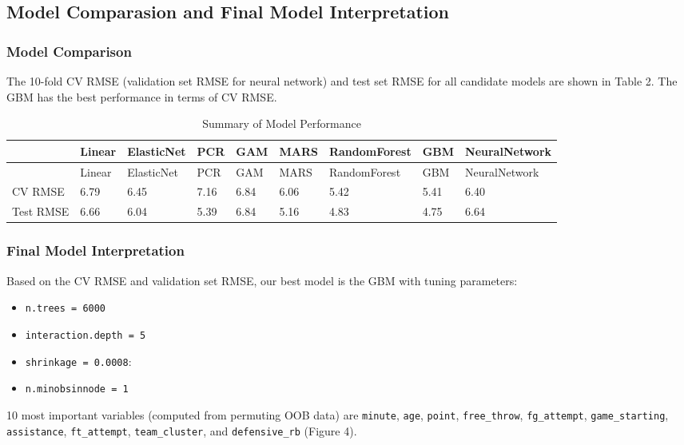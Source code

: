 \documentclass[
]{article}
\begin{document}
\hypertarget{model-comparasion-and-final-model-interpretation}{%
\subsection{Model Comparasion and Final Model
Interpretation}\label{model-comparasion-and-final-model-interpretation}}

\hypertarget{model-comparison}{%
\subsubsection{Model Comparison}\label{model-comparison}}

The 10-fold CV RMSE (validation set RMSE for neural network) and test
set RMSE for all candidate models are shown in Table 2. The GBM has the
best performance in terms of CV RMSE.

\begin{longtable}[]{@{}lllllllll@{}}
\caption{Summary of Model Performance}\tabularnewline
\toprule
& Linear & ElasticNet & PCR & GAM & MARS & RandomForest & GBM &
NeuralNetwork \\
\midrule
\endfirsthead
\toprule
& Linear & ElasticNet & PCR & GAM & MARS & RandomForest & GBM &
NeuralNetwork \\
\midrule
\endhead
CV RMSE & 6.79 & 6.45 & 7.16 & 6.84 & 6.06 & 5.42 & 5.41 & 6.40 \\
Test RMSE & 6.66 & 6.04 & 5.39 & 6.84 & 5.16 & 4.83 & 4.75 & 6.64 \\
\bottomrule
\end{longtable}

\hypertarget{final-model-interpretation}{%
\subsubsection{Final Model
Interpretation}\label{final-model-interpretation}}

Based on the CV RMSE and validation set RMSE, our best model is the GBM
with tuning parameters:

\begin{itemize}
\item
  \texttt{n.trees\ =\ 6000}
\item
  \texttt{interaction.depth\ =\ 5}
\item
  \texttt{shrinkage\ =\ 0.0008}:
\item
  \texttt{n.minobsinnode\ =\ 1}
\end{itemize}

10 most important variables (computed from permuting OOB data) are
\texttt{minute}, \texttt{age}, \texttt{point}, \texttt{free\_throw},
\texttt{fg\_attempt}, \texttt{game\_starting}, \texttt{assistance},
\texttt{ft\_attempt}, \texttt{team\_cluster}, and \texttt{defensive\_rb}
(Figure 4).
\end{document}
